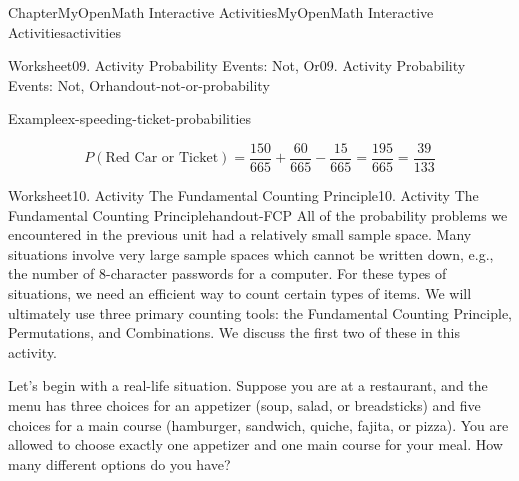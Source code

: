 \documentclass[oneside,10pt,]{book}
\newcommand{\blocktitlefont}{\relax}
\newcommand{\ptxlistdisc}{\raisebox{0.3ex}{\textbullet}}
\newlength{\fillinmaxwidth}
\newlength{\fillincontract}
\newlength{\charmaxwidth}\setlength{\charmaxwidth}{0.5em}
\newlength{\charminwidth}\setlength{\charminwidth}{0.1em}
\newlength{\fillinheight}
\newcommand{\fillintext}[1]{%
\setlength{\fillinmaxwidth}{#1\charmaxwidth}%
\setlength{\fillincontract}{#1\charminwidth}%
\setlength{\fillinheight}{\baselineskip}\addtolength{\fillinheight}{1.2pt}%
\strut\nobreak\leaders\vbox{\hrule width 0.3pt height 0.3pt \vskip -1.2pt}\hskip 1\fillinmaxwidth minus \fillincontract\nobreak\strut%
}
\begin{document}
\begin{chapterptx}{Chapter}{MyOpenMath Interactive Activities}{}{MyOpenMath Interactive Activities}{}{}{activities}
\begin{worksheet-section}{Worksheet}{09. Activity Probability Events: Not, Or}{}{09. Activity Probability Events: Not, Or}{}{}{handout-not-or-probability}
\begin{example}{Example}{}{ex-speeding-ticket-probabilities}
\begin{enumerate}[label={\alph*)}]
\begin{equation*}
P(\text{Red Car or Ticket}) = \frac{150}{665} + \frac{60}{665} - \frac{15}{665} = \frac{195}{665} = \frac{39}{133}
\end{equation*}
%
\end{enumerate}
%
\end{example}
%
\end{worksheet-section}
\restoregeometry
%
%
\typeout{************************************************}
\typeout{************************************************}
%
\begin{worksheet-section}{Worksheet}{10. Activity The Fundamental Counting Principle}{}{10. Activity The Fundamental Counting Principle}{}{}{handout-FCP}
All of the probability problems we encountered in the previous unit had a relatively small sample space. Many situations involve very large sample spaces which cannot be written down, e.g., the number of \(8\)-character passwords for a computer. For these types of situations, we need an efficient way to count certain types of items. We will ultimately use three primary counting tools: the Fundamental Counting Principle, Permutations, and Combinations. We discuss the first two of these in this activity.%
\par
Let's begin with a real-life situation. Suppose you are at a restaurant, and the menu has three choices for an appetizer (soup, salad, or breadsticks) and five choices for a main course (hamburger, sandwich, quiche, fajita, or pizza). You are allowed to choose exactly one appetizer and one main course for your meal. How many different options do you have?%

\end{worksheet-section}
\end{chapterptx}
\end{document}
